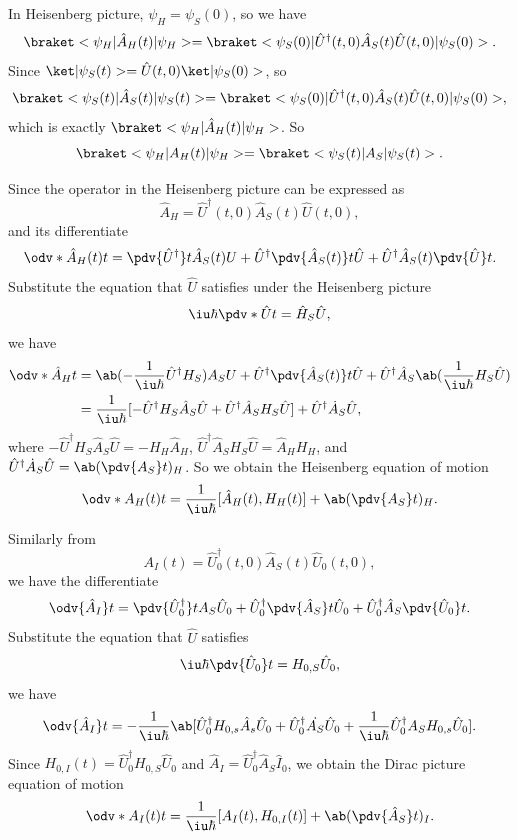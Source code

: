 \begin{solution}\leavevmode
  \begin{enumext}[label = (\alph*)]
    \item In Heisenberg picture, $\psi_H = \psi_S(0)$, so we have
    \[
      \braket<\psi_H|\hat A_H(t)|\psi_H>
    = \braket<\psi_S(0)|\hat U^\dagger(t,0) \hat A_S(t) \hat U(t,0)|\psi_S(0)>.
    \]
    Since $\ket|\psi_S(t)> = \hat U(t,0) \ket|\psi_S(0)>$, so
    \[
      \braket<\psi_S(t)|\hat A_S(t)|\psi_S(t)>
      = \braket<\psi_S(0)|\hat U^\dagger(t,0) \hat A_S(t) \hat U(t,0)|\psi_S(0)>,
    \]
    which is exactly $\braket<\psi_H|\hat A_H(t)|\psi_H>$. So
    \[
      \braket<\psi_H|A_H(t)|\psi_H> = \braket<\psi_S(t)|A_S|\psi_S(t)>.
    \]
    \item Since the operator in the Heisenberg picture can be expressed as
    \[
      \hat A_H = \hat U^\dagger(t,0) \hat A_S(t) \hat U(t,0),
    \]
    and its differentiate
    \[
      \odv*{\hat A_H(t)}t = \pdv{\hat U^\dagger}t \hat A_S(t) U
    + \hat U^\dagger \pdv{\hat A_S(t)}t \hat U
    + \hat U^\dagger \hat A_S(t) \pdv{\hat U}t.
    \]
    Substitute the equation that $\hat U$ satisfies under the Heisenberg picture
    \[
      \iu\hbar \pdv*{\hat U}t = \hat H_S \hat U,
    \]
    we have
    \begin{align*}
      \odv*{\hat A_H}t & = \ab(-\frac1{\iu\hbar} \hat U^\dagger H_S) A_SU
    + \hat U^\dagger \pdv{\hat A_S(t)}t \hat U
    + \hat U^\dagger \hat A_S \ab(\frac1{\iu\hbar} H_S \hat U)\\
    & = \frac1{\iu\hbar} [-\hat U^\dagger H_S \hat A_S \hat U +
      \hat U^\dagger \hat A_S H_S \hat U] + \hat U^\dagger \dot A_S \hat U,
    \end{align*}
    where $-\hat U^\dagger H_S \hat A_S \hat U = -H_H\hat A_H$,
    $\hat U^\dagger \hat A_S H_S \hat U = \hat A_HH_H$,
    and $\hat U^\dagger \dot A_S \hat U = \ab(\pdv{A_S}t)_H$.
    So we obtain the Heisenberg equation of motion
    \[
      \odv*{A_H(t)}t = \frac1{\iu\hbar} [\hat A_H(t), H_H(t)] + \ab(\pdv{A_S}t)_H.
    \]
    \item Similarly from
    \[
      A_I(t) = \hat U_0^\dagger(t,0) \hat A_S(t) \hat U_0(t,0),
    \]
    we have the differentiate
    \[
      \odv{\hat A_I}t = \pdv{\hat U_0^\dagger}t A_S \hat U_0
    + \hat U_0^\dagger \pdv{\hat A_S}t \hat U_0 + \hat U_0^\dagger \hat A_S \pdv{\hat U_0}t.
    \]
    Substitute the equation that $\hat U$ satisfies
    \[
      \iu\hbar \pdv{\hat U_0}t = H_{0,S} \hat U_0,
    \]
    we have
    \[
      \odv{\hat A_I}t = -\frac1{\iu\hbar}
      \ab[\hat U_0^\dagger H_{0,s} \hat A_s \hat U_0
      + \hat U_0^\dagger \dot{A_S} \hat U_0
      + \frac1{\iu\hbar} \hat U_0^\dagger A_S H_{0,s} \hat U_0].
    \]
    Since $H_{0,I}(t) = \hat U_0^\dagger H_{0,S} \hat U_0$
    and $\hat A_I = \hat U_0^\dagger \hat A_S \hat I_0$,
    we obtain the Dirac picture equation of motion
    \[
      \odv*{A_I(t)}t = \frac1{\iu\hbar} [A_I(t), H_{0,I}(t)]
    + \ab(\pdv{\hat A_S}t)_I.
    \]
  \end{enumext}
\end{solution}